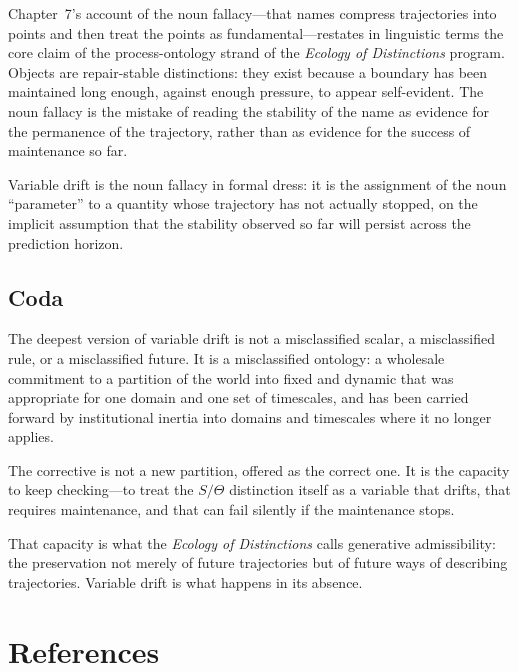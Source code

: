 \documentclass[11pt]{book}
\theoremstyle{plain}
\theoremstyle{definition}
\theoremstyle{remark}
\begin{document}
\begin{sloppypar}
Chapter~7's account of the noun fallacy---that names compress trajectories into points and then treat the points as fundamental---restates in linguistic terms the core claim of the process-ontology strand of the \emph{Ecology of Distinctions} program. Objects are repair-stable distinctions: they exist because a boundary has been maintained long enough, against enough pressure, to appear self-evident. The noun fallacy is the mistake of reading the stability of the name as evidence for the permanence of the trajectory, rather than as evidence for the success of maintenance so far.
\end{sloppypar}

\begin{sloppypar}
Variable drift is the noun fallacy in formal dress: it is the assignment of the noun ``parameter'' to a quantity whose trajectory has not actually stopped, on the implicit assumption that the stability observed so far will persist across the prediction horizon.
\end{sloppypar}

\section*{Coda}

The deepest version of variable drift is not a misclassified scalar, a misclassified rule, or a misclassified future. It is a misclassified ontology: a wholesale commitment to a partition of the world into fixed and dynamic that was appropriate for one domain and one set of timescales, and has been carried forward by institutional inertia into domains and timescales where it no longer applies.

The corrective is not a new partition, offered as the correct one. It is the capacity to keep checking---to treat the $S/\Theta$ distinction itself as a variable that drifts, that requires maintenance, and that can fail silently if the maintenance stops.

That capacity is what the \emph{Ecology of Distinctions} calls generative admissibility: the preservation not merely of future trajectories but of future ways of describing trajectories. Variable drift is what happens in its absence.

\chapter*{References}
\end{document}
